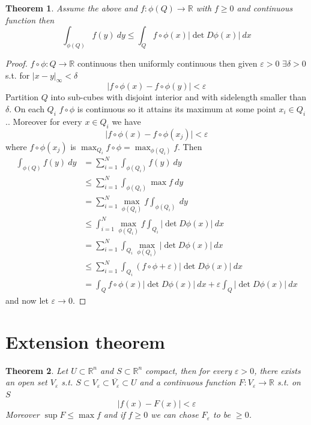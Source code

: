 \documentclass[11pt,openany]{book}
\theoremstyle{plain}
\newtheorem{theorem}{Theorem}[chapter]
\theoremstyle{definition}
\theoremstyle{remark}
\newcommand{\R}{\mathbb{R}}
\newcommand{\abs}[1]{\lvert #1 \rvert}
\begin{document}
\begin{theorem}
    Assume the above and $f \colon \phi(Q) \to \R$ with $f \ge 0$ and continuous function then 
    $$\int_{\phi(Q)} f(y) \ dy \le \int_Q f \circ \phi(x) \abs{\det D\phi (x)} \ dx$$
\end{theorem}

\begin{proof}
    $f \circ \phi \colon Q \to \R$ continuous then uniformly continuous then 
    given $\varepsilon > 0$ $\exists \delta > 0$ s.t. for $\abs{x-y}_\infty < \delta$
    $$\abs{f \circ \phi(x) - f \circ \phi(y)} < \varepsilon$$
    Partition $Q$ into sub-cubes with disjoint interior and with sidelength smaller than 
    $\delta$. On each $Q_i$ $f \circ \phi$ is continuous so it attains its maximum at some point $x_i \in Q_i$.. 
    Moreover for every $x \in Q_i$ we have 
    $$\abs{f \circ \phi(x) - f \circ \phi(x_j)} < \varepsilon$$
    where $f \circ \phi(x_j)$ is $\max_{Q_i} f \circ \phi = \max_{\phi(Q_i)} f$. 
    Then 
    \begin{align*}
        \int_{\phi(Q)} f(y) \ dy &= \sum_{i=1}^N \int_{\phi(Q_i)} f(y) \ dy \\
        &\le \sum_{i=1}^N \int_{\phi(Q_i)} \max f \ dy \\
        &= \sum_{i=1}^N \max_{\phi(Q_i)} f \int_{\phi(Q_i) }\ dy  \\
        &\le \int_{i=1}^N \max_{\phi(Q_i)} f \int_{Q_i} \abs{\det D \phi(x)} \ dx \\
        &= \sum_{i=1}^N \int_{Q_i} \max_{\phi(Q_i)} \abs{\det D\phi(x)} \ dx \\
        &\le \sum_{i=1}^N \int_{Q_i} (f \circ \phi + \varepsilon) \abs{\det D\phi(x)} \ dx \\
        &= \int_Q f \circ \phi(x) \abs{\det D\phi(x)} \ dx + \varepsilon \int_Q \abs{\det D\phi (x)} \ dx
    \end{align*}
    and now let $\varepsilon \to 0$. 
\end{proof}

\section{Extension theorem} 

\begin{theorem}
    Let $U \subset \R^n$ and $S \subset \R^n$ compact, then for every $\varepsilon > 0$, there exists an 
    open set $V_\varepsilon$ s.t. $S \subset V_\varepsilon \subset \overline{V_\varepsilon} \subset U$ and a  
    continuous function $F \colon V_\varepsilon \to \R$ s.t. on $S$ 
    $$\abs{f(x) - F(x)} < \varepsilon$$
    Moreover $\sup F \le \max f$ and if $f \ge 0$ we can chose $F_\varepsilon$ to be $\ge 0$. 
\end{theorem}
\end{document}
